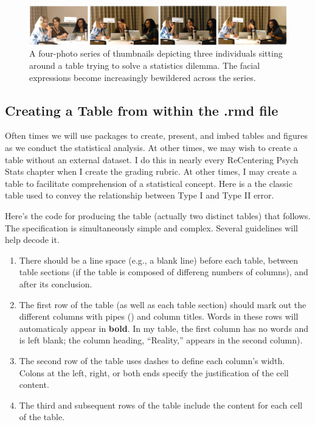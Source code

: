 \documentclass[
]{book}
\providecommand{\tightlist}{%
  \setlength{\itemsep}{0pt}\setlength{\parskip}{0pt}}
\begin{document}
\begin{figure}
\centering
\includegraphics{images/formatting/StatsConsult.png}
\caption{A four-photo series of thumbnails depicting three individuals sitting around a table trying to solve a statistics dilemma. The facial expressions become increasingly bewildered across the series.}
\end{figure}

\hypertarget{creating-a-table-from-within-the-.rmd-file}{%
\subsection{Creating a Table from within the .rmd file}\label{creating-a-table-from-within-the-.rmd-file}}

Often times we will use packages to create, present, and imbed tables and figures as we conduct the statistical analysis. At other times, we may wish to create a table without an external dataset. I do this in nearly every ReCentering Psych Stats chapter when I create the grading rubric. At other times, I may create a table to facilitate comprehension of a statistical concept. Here is a the classic table used to convey the relationship between Type I and Type II error.

Here's the code for producing the table (actually two distinct tables) that follows. The specification is simultaneously simple and complex. Several guidelines will help decode it.

\begin{enumerate}
\def\labelenumi{\arabic{enumi}.}
\tightlist
\item
  There should be a line space (e.g., a blank line) before each table, between table sections (if the table is composed of differeng numbers of columns), and after its conclusion.
\item
  The first row of the table (as well as each table section) should mark out the different columns with pipes (\texttt{\textbar{}}) and column titles. Words in these rows will automaticaly appear in \textbf{bold}. In my table, the first column has no words and is left blank; the column heading, ``Reality,'' appears in the second column).
\item
  The second row of the table uses dashes to define each column's width. Colons at the left, right, or both ends specify the justification of the cell content.
\item
  The third and subsequent rows of the table include the content for each cell of the table.
\end{enumerate}
\end{document}
